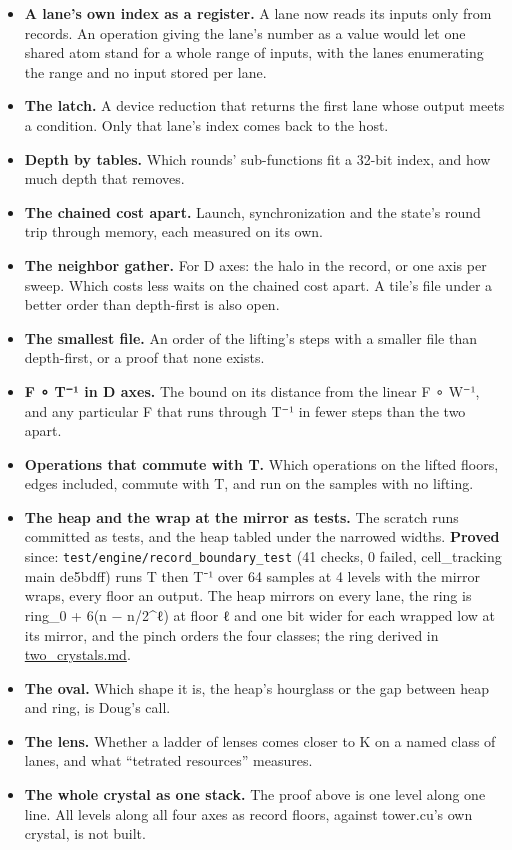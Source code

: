 \begin{itemize}
\item \textbf{A lane's own index as a register.} A lane now reads its inputs only from records. An operation giving the lane's number as a value would let one shared atom stand for a whole range of inputs, with the lanes enumerating the range and no input stored per lane.
\item \textbf{The latch.} A device reduction that returns the first lane whose output meets a condition. Only that lane's index comes back to the host.
\item \textbf{Depth by tables.} Which rounds' sub-functions fit a 32-bit index, and how much depth that removes.
\item \textbf{The chained cost apart.} Launch, synchronization and the state's round trip through memory, each measured on its own.
\item \textbf{The neighbor gather.} For D axes: the halo in the record, or one axis per sweep. Which costs less waits on the chained cost apart. A tile's file under a better order than depth-first is also open.
\item \textbf{The smallest file.} An order of the lifting's steps with a smaller file than depth-first, or a proof that none exists.
\item \textbf{F ∘ T⁻¹ in D axes.} The bound on its distance from the linear F ∘ W⁻¹, and any particular F that runs through T⁻¹ in fewer steps than the two apart.
\item \textbf{Operations that commute with T.} Which operations on the lifted floors, edges included, commute with T, and run on the samples with no lifting.
\item \textbf{The heap and the wrap at the mirror as tests.} The scratch runs committed as tests, and the heap tabled under the narrowed widths. \textbf{Proved} since: \texttt{test/\allowbreak{}engine/\allowbreak{}record\_\allowbreak{}boundary\_\allowbreak{}test} (41 checks, 0 failed, cell\_\allowbreak{}tracking main de5bdff) runs T then T⁻¹ over 64 samples at 4 levels with the mirror wraps, every floor an output. The heap mirrors on every lane, the ring is ring\_\allowbreak{}0 + 6(n − n/2\textasciicircum{}ℓ) at floor ℓ and one bit wider for each wrapped low at its mirror, and the pinch orders the four classes; the ring derived in \hyperref[chap:two-crystals]{two\_\allowbreak{}crystals.md}.
\item \textbf{The oval.} Which shape it is, the heap's hourglass or the gap between heap and ring, is Doug's call.
\item \textbf{The lens.} Whether a ladder of lenses comes closer to K on a named class of lanes, and what “tetrated resources” measures.
\item \textbf{The whole crystal as one stack.} The proof above is one level along one line. All levels along all four axes as record floors, against tower.cu's own crystal, is not built.
\end{itemize}
